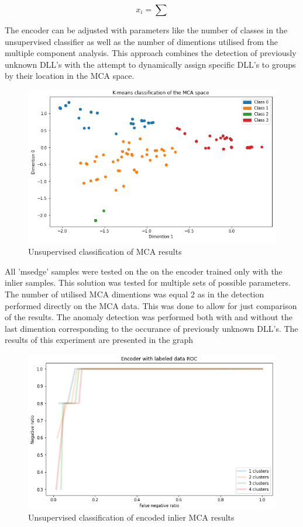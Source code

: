 \documentclass[a4paper,twoside,12pt]{book}
\begin{document}
\begin{equation} \label{eu_eqn}
	x_{i} = 
	\sum 
\end{equation}

The encoder can be adjusted with parameters like the number of classes in the unsupervised 
classifier as well as the number of dimentions utilised from the multiple component analysis. 
This approach combines the detection of previously unknown DLL's with the attempt to dynamically
 assign specific DLL's to groups by their location in the MCA space. 


 \begin{figure}
	\centering
	\includegraphics[scale=0.9]{images/KmeanMCA}
	\caption{Unsupervised classification of MCA results}
	\label{fig:kmeanmca}
 \end{figure}

All 'msedge' samples were tested on the on the encoder trained only with the inlier samples.
This solution was tested for multiple sets of possible parameters. The number of utilised MCA 
dimentions was equal 2 as in the detection performed directly on the MCA data. This was done to 
allow for just comparison of the results. The anomaly detection was performed
both with and without the last dimention corresponding to the occurance of previously unknown DLL's.
The results of this experiment are presented in the graph 


\begin{figure}
	\centering
	\includegraphics[scale=0.9]{images/EncROCwLab}
	\caption{Unsupervised classification of encoded inlier MCA results}
	\label{fig:EncROCwLab}
 \end{figure}
\end{document}
